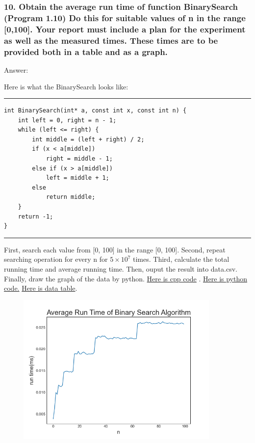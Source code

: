 \documentclass[a4paper]{article}
\begin{document}
\subsubsection*{10. Obtain the average run time of function BinarySearch (Program 1.10) Do this for suitable values of n in the range [0,100]. Your report must include a plan for the experiment as well as the measured times. These times are to be provided both in a table and as a graph.}
\begin{spacing}{1.3}
Answer:\par
Here is what the BinarySearch looks like:
\end{spacing}
\hrule
\begin{lstlisting}
int BinarySearch(int* a, const int x, const int n) {
    int left = 0, right = n - 1;
    while (left <= right) {
        int middle = (left + right) / 2;
        if (x < a[middle])
            right = middle - 1;
        else if (x > a[middle])
            left = middle + 1;
        else
            return middle;
    }
    return -1;
}
\end{lstlisting}
\hrule
First, search each value from [0, 100] in the range [0, 100]. Second, repeat searching operation for every n for $5\times10^7$ times. Third, calculate the total running time and average running time. Then, ouput the result into data.csv. Finally, draw the graph of the data by python. \href{run:test.cpp}{Here is cpp code} . \href{run:graph.py}{Here is python code.} \href{run:data.csv}{Here is data table}.
\begin{figure}[htbp]
\centering
\includegraphics[width=10cm]{Figure_1.png}
\label{2}
\end{figure}
\end{document}
